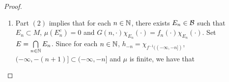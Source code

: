 \documentclass{book}
\begin{document}
\begin{proof}
\begin{enumerate}
			\begin{align*}
				\|h_n - \chi_{X}\|_1
				& = \mu(f^{-1}((n, \infty))) \\
				& = f_* \mu ((n, \infty)) \\
				& \rightarrow f_* \mu(\varnothing) \\
				& = 0 
			\end{align*}
			So that $h_{n} \conv{L^1(\mu)} \chi_{X}$. Therefore  
			\begin{align*}
				f_n 
				& = P^{\mu}_{\MB} h_n \\
				& \conv{L^1(\mu_{\MB})} P^{\mu}_{\MB} \chi_{X} \\
				& = \chi_{X}
			\end{align*}
			This implies that $f_n \conv{\mu_{\MB}} \chi_{X}$. Since $(f_n)_{n \in \N}$ is increasing $\mu_{\MB}$-a.e., an exercise in the section on modes of convergence implies that $f_n \convt{$\mu_{\MB}$-a.e.} \chi_{X}$. So there exists $N_2 \in \MB$ such that $\mu_{\MB}(N_2^c) = 0$ and $f_n \chi_{N_2} \convt{p.w.} \chi_{N_2}$. Set $M^+ = E \cap N_2$. Then  $M^+ \subset E \subset M$ and
			\begin{align*}
				\mu_{\MB}((M^+)^c)
				& = \mu_{\MB}(E^c \cup N_2^c) \\ 
				& \leq \mu_{\MB}(E^c) + \mu_{\MB}(N_2^c) \\
				& = \mu_{\MB} \bigg( \bigcup_{n \in \N} E_n^c \bigg) + \mu_{\MB}(N_2^c) \\
				& \leq \bigg[\sum\limits_{n \in \N} \mu_{\MB}(E_n^c) \bigg] + \mu_{\MB}(N_2^c) \\
				& = 0
			\end{align*}
			Since $M^+ \subset M$, for each $x \in M^+$, $(f_n(x))_{n \in \N}$ is increasing. Hence for each $x \in M^+$,
			\begin{align*}
				\sup\limits_{z \in \R} G(z, x) 
				& = \sup\limits_{n \in \N} G(n, x) \\
				& = \sup\limits_{n \in \N} f_n(x) \\
				& = 1
			\end{align*}
			Thus $\sup\limits_{z \in \R} G(z, \cdot) = 1$ $\mu_{\MB}$-a.e.\\
		\item Part $(2)$ implies that for each $n \in \mathbb{N}$, there exists $E_n \in \mathcal{B}$ such that $E_n \subset M$, $\mu(E_n^c) = 0$ and $G(n, \cdot)\chi_{E_n}(\cdot) = f_n(\cdot) \chi_{E_n}(\cdot)$. Set $E = \bigcap\limits_{n \in \mathbb{N}} E_n$. Since for each $n \in \mathbb{N}$, $h_{-n} = \chi_{f^{-1}((-\infty, -n])}$, $(-\infty, -(n + 1)] \subset (-\infty, -n]$ and $\mu$ is finite, we have that 

\end{enumerate}
\end{proof}
\end{document}
